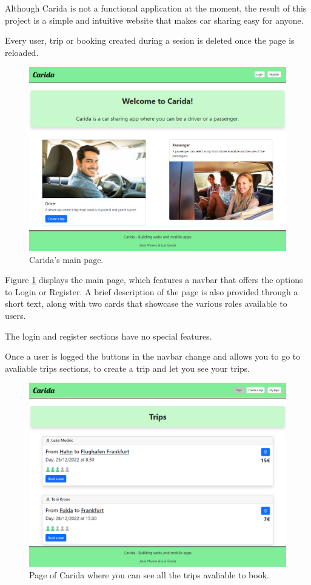 \documentclass{article}
\begin{document}
  Although Carida is not a functional application at the moment, the result of this project is a simple and intuitive website that makes car sharing easy for anyone.

  Every user, trip or booking created during a sesion is deleted once the page is reloaded.

  \begin{figure}[h]
    \centering
    \includegraphics[width=1\columnwidth]{figures/Main page.png}
    \caption{Carida's main page.\label{fig:main page.png}}
    \end{figure}

    Figure \ref{fig:main page.png} displays the main page, which features a navbar that offers the options to Login or Register. A brief description of the page is also provided through a short text, along with two cards that showcase the various roles available to users.

    The login and register sections have no special features.

    Once a user is logged the buttons in the navbar change and allows you to go to avaliable trips sections, to create a trip and let you see your trips.

  \begin{figure}[h]
    \centering
    \includegraphics[width=1\columnwidth]{figures/Trips page.png}
    \caption{Page of Carida where you can see all the trips avaliable to book.\label{fig:trip page.png}}
    \end{figure}
\end{document}
